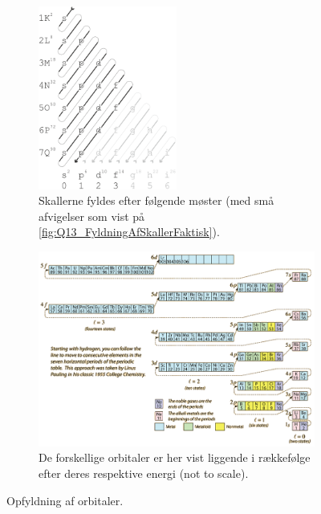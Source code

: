 \begin{figure}[!h]
    \centering
    \begin{subfigure}[t]{\textwidth}
        \centering
        \includegraphics[width=0.5\textwidth]{Q13/images/FyldningAfSkaller3.png}
        \caption{Skallerne fyldes efter følgende møster (med små afvigelser som vist på \cref{fig:Q13_FyldningAfSkallerFaktisk}).}
        \label{fig:Q13_FyldningAfSkaller1}
    \end{subfigure}
    \vfill
    \begin{subfigure}[t]{\textwidth}
        \centering
        \includegraphics[width=\textwidth]{Q13/images/FyldningAfSkaller2.png}
        \caption{De forskellige orbitaler er her vist liggende i rækkefølge efter deres respektive energi (not to scale).}
        \label{fig:Q13_FyldningAfSkaller2}
    \end{subfigure}
    \caption{Opfyldning af orbitaler.}
    \label{fig:Q13_FyldningAfSkaller}
\end{figure}

